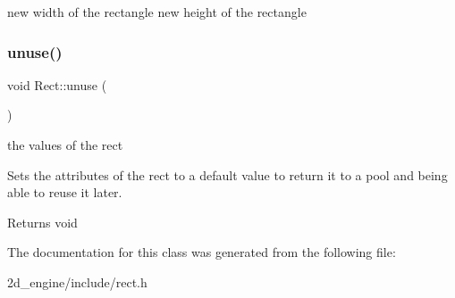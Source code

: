 new width of the rectangle  new height of the rectangle \mbox{\label{class_rect_a31c7cbadb97080dfb559f3d04acc0bc9}} 
\subsubsection{\texorpdfstring{unuse()}{unuse()}}
{\footnotesize\ttfamily void Rect\+::unuse (\begin{DoxyParamCaption}{ }\end{DoxyParamCaption})}

the values of the rect

Sets the attributes of the rect to a default value to return it to a pool and being able to reuse it later.

\begin{DoxyReturn}{Returns}
void 
\end{DoxyReturn}


The documentation for this class was generated from the following file\+:\begin{DoxyCompactItemize}
\item 
2d\+\_\+engine/include/rect.\+h\end{DoxyCompactItemize}
